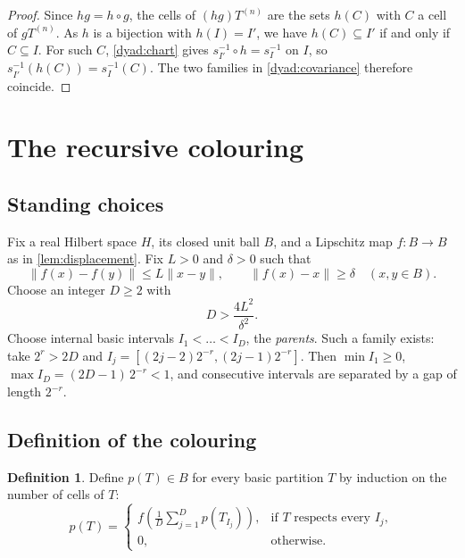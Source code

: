 \documentclass[11pt]{article}
\newcommand{\norm}[1]{\lVert #1\rVert}
\theoremstyle{definition}
\newtheorem{definition}[theorem]{Definition}
\numberwithin{equation}{section}
\begin{document}
\begin{proof}
Since \(hg=h\circ g\), the cells of \((hg)T^{(n)}\) are the sets \(h(C)\)
with \(C\) a cell of \(gT^{(n)}\). As \(h\) is a bijection with
\(h(I)=I'\), we have \(h(C)\subseteq I'\) if and only if \(C\subseteq I\).
For such \(C\), \eqref{dyad:chart} gives \(s_{I'}^{-1}\circ h=s_I^{-1}\) on
\(I\), so \(s_{I'}^{-1}(h(C))=s_I^{-1}(C)\). The two families in
\eqref{dyad:covariance} therefore coincide.
\end{proof}

\section{The recursive colouring}\label{sec:coloring}

\subsection{Standing choices}
Fix a real Hilbert space \(H\), its closed unit ball \(B\), and a
Lipschitz map \(f:B\to B\) as in \cref{lem:displacement}. Fix
\(L>0\) and \(\delta>0\) such that
\begin{equation}\label{color:map}
  \norm{f(x)-f(y)}\le L\norm{x-y},\qquad
  \norm{f(x)-x}\ge\delta
  \quad(x,y\in B).
\end{equation}
Choose an integer \(D\ge2\) with
\begin{equation}\label{color:parameters}
  D>\frac{4L^2}{\delta^2}.
\end{equation}
Choose internal basic intervals \(I_1<\dots<I_D\), the \emph{parents}.
Such a family exists: take \(2^r>2D\) and
\(I_j=[(2j-2)2^{-r},(2j-1)2^{-r}]\). Then \(\min I_1\ge0\),
\(\max I_D=(2D-1)\,2^{-r}<1\), and consecutive intervals are separated by a gap
of length \(2^{-r}\).

\subsection{Definition of the colouring}

\begin{definition}\label{color:def}
Define \(p(T)\in B\) for every basic partition \(T\) by induction on the
number of cells of \(T\):
\begin{equation}\label{color:recursion}
  p(T)=
  \begin{cases}
  \displaystyle f\left(\frac1D\sum_{j=1}^D p(T_{I_j})\right),
       &\text{if \(T\) respects every \(I_j\)},\\[6pt]
  0,   &\text{otherwise}.
  \end{cases}
\end{equation}
\end{definition}
\end{document}
